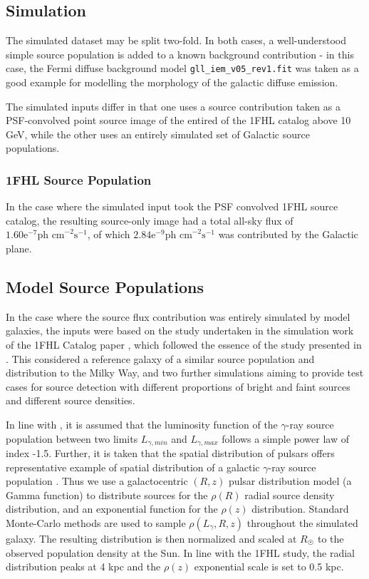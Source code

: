 \documentclass{PoS}
\begin{document}
\subsection{Simulation}

The simulated dataset may be split two-fold. In both cases, a well-understood simple source population is added to a known background contribution - in this case, the Fermi diffuse background model \verb|gll_iem_v05_rev1.fit| was taken as a good example for modelling the morphology of the galactic diffuse emission.

The simulated inputs differ in that one uses a source contribution taken as a PSF-convolved point source image of the entired of the 1FHL catalog above 10 GeV, while the other uses an entirely simulated set of Galactic source populations.

\subsubsection{1FHL Source Population}

In the case where the simulated input took the PSF convolved 1FHL source catalog, the resulting source-only image had a total all-sky flux of $1.60\text{e}^{-7} \text{ph cm}^{-2}\text{s}^{-1}$, of which $2.84\text{e}^{-9} \text{ph cm}^{-2}\text{s}^{-1}$ was contributed by the Galactic plane.

\subsection{Model Source Populations}

In the case where the source flux contribution was entirely simulated by model galaxies, the inputs were based on the study undertaken in the simulation work of the 1FHL Catalog paper \cite[p.59]{1fhl}, which followed the essence of the study presented in \cite{Strong}. This considered a reference galaxy of a similar source population and distribution to the Milky Way, and two further simulations aiming to provide test cases for source detection with different proportions of bright and faint sources and different source densities.

In line with \cite{Strong}, it is assumed that the luminosity function of the $\gamma$-ray source population between two limits $L_{\gamma, min}$ and $L_{\gamma, max}$ follows a simple power law of index -1.5. Further, it is taken that the spatial distribution of pulsars offers representative example of spatial distribution of a galactic $\gamma$-ray source population \cite[p.2]{Strong}. Thus we use a galactocentric $(R, z)$ pulsar distribution model \cite[p.7]{Lorimer} (a Gamma function) to distribute sources for the $\rho(R)$ radial source density distribution, and an exponential function for the $\rho(z)$ distribution. Standard Monte-Carlo methods are used to sample $\rho(L_{\gamma}, R, z)$ throughout the simulated galaxy. The resulting distribution is then normalized and scaled at $R_{\astrosun}$ to the observed population density at the Sun. In line with the 1FHL study, the radial distribution peaks at 4 kpc and the $\rho(z)$ exponential scale is set to 0.5 kpc.
\end{document}
